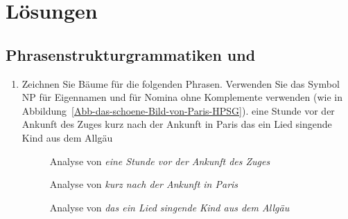 \chapter{Lösungen}

\section{Phrasenstrukturgrammatiken und \xbart}

\begin{enumerate}
\item Zeichnen Sie Bäume für die folgenden Phrasen. Verwenden Sie das Symbol NP für Eigennamen und \nbar für
  Nomina ohne Komplemente verwenden (wie in Abbildung~\ref{Abb-das-schoene-Bild-von-Paris-HPSG}).
\eal
\ex eine Stunde vor der Ankunft des Zuges
\ex kurz nach der Ankunft in Paris
\ex das ein Lied singende Kind aus dem Allgäu
\zl

\begin{figure}
\caption{Analyse von \emph{eine Stunde vor der Ankunft des Zuges}}
\end{figure}

\begin{figure}
\caption{Analyse von \emph{kurz nach der Ankunft in Paris}}
\end{figure}

\begin{figure}
\caption{Analyse von \emph{das ein Lied singende Kind aus dem Allgäu}}
\end{figure}


\end{enumerate}
